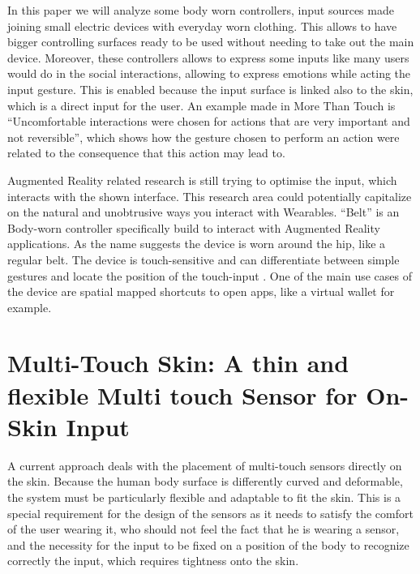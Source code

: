 \documentclass{sigchi}
\begin{document}
In this paper we will analyze some body worn controllers, input sources made joining small electric devices with everyday worn clothing. This allows to have bigger controlling surfaces ready to be used without needing to take out the main device. Moreover, these controllers allows to express some inputs like many users would do in the social interactions, allowing to express emotions while acting the input gesture. This is enabled because the input surface is linked also to the skin, which is a direct input for the user. An example made in More Than Touch \cite[p.185]{more-touch} is “Uncomfortable interactions were chosen for actions that are very important and not reversible”, which shows how the gesture chosen to perform an action were related to the consequence that this action may lead to.

Augmented Reality related research is still trying to optimise the input, which interacts with the shown interface. This research area could potentially capitalize on the natural and unobtrusive ways you interact with Wearables.
“Belt” \cite{belt} is an Body-worn controller specifically build to interact with Augmented Reality applications. As the name suggests the device is worn around the hip, like a regular belt. The device is touch-sensitive and can differentiate between simple gestures and locate the position of the touch-input \cite[p. 2136]{belt}.%
 One of the main use cases of the device are spatial mapped shortcuts to open apps, like a virtual wallet for example. \cite{belt}


\section{Multi-Touch Skin: A thin and flexible Multi touch Sensor for On-Skin Input}
A current approach deals with the placement of multi-touch sensors directly on the skin. Because the human body surface is differently curved and deformable, the system must be particularly flexible and adaptable to fit the skin. This is a special requirement for the design of the sensors as it needs to satisfy the comfort of the user wearing it, who should not feel the fact that he is wearing a sensor, and the necessity for the input to be fixed on a position of the body to recognize correctly the input, which requires tightness onto the skin. \cite{ulbrich2,iSkin}%
\end{document}
